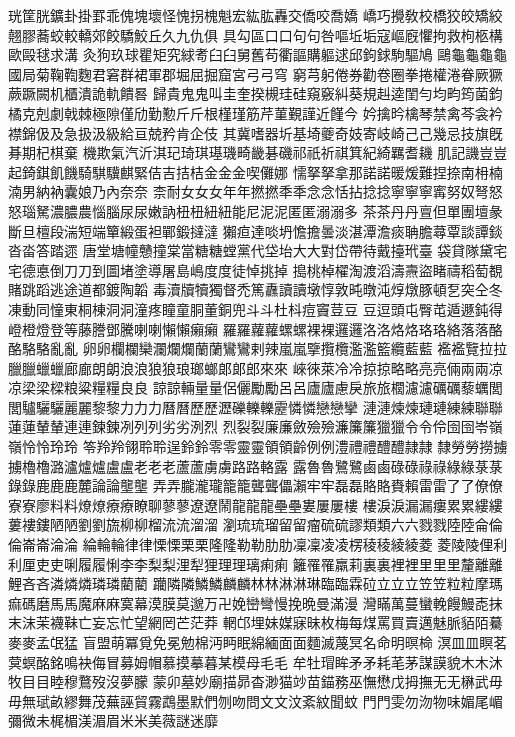 珖筐胱鑛卦掛罫乖傀塊壞怪愧拐槐魁宏紘肱轟交僑咬喬嬌
嶠巧攪敎校橋狡皎矯絞翹膠蕎蛟較轎郊餃驕鮫丘久九仇俱
具勾區⼝口句句咎嘔坵垢寇嶇廐懼拘救枸柩構歐毆毬求溝
灸狗玖球瞿矩究絿耉⾅臼舅舊苟衢謳購軀逑邱鉤銶駒驅鳩
鷗⿔龜龜龜國局菊鞠鞫麴君窘群裙軍郡堀屈掘窟宮⼸弓穹
窮芎躬倦券勸卷圈拳捲權淃眷厥獗蕨蹶闕机櫃潰詭軌饋晷
歸貴⿁鬼叫圭奎揆槻珪硅窺竅糾葵規赳逵閨勻均畇筠菌鈞
橘克剋劇戟棘極隙僅劤勤懃⽄斤根槿瑾筋芹菫覲謹近饉今
妗擒昑檎琴禁禽芩衾衿襟錦伋及急扱汲級給亘兢矜肯企伎
其冀嗜器圻基埼夔奇妓寄岐崎⼰己幾忌技旗旣朞期杞棋棄
機欺氣汽沂淇玘琦琪璂璣畸畿碁磯祁祇祈祺箕紀綺羈耆耭
肌記譏豈豈起錡錤飢饑騎騏驥麒緊佶吉拮桔⾦金金喫儺娜
懦拏拏拿那諾諾暖煖難捏捺南枏楠湳男納衲囊娘乃內奈奈
柰耐⼥女女年年撚撚秊秊念念恬拈捻捻寧寧寧寗努奴弩怒
怒瑙駑濃膿農惱腦尿尿嫩訥杻杻紐紐能尼泥泥匿匿溺溺多
茶茶丹丹亶但單團壇彖斷旦檀段湍短端簞緞蛋袒鄲鍛撻澾
獺疸達啖坍憺擔曇淡湛潭澹痰聃膽蕁覃談譚錟沓畓答踏遝
唐堂塘幢戇撞棠當糖糖螳黨代垈坮⼤大對岱帶待戴擡玳臺
袋貸隊黛宅宅德悳倒⼑刀到圖堵塗導屠島嶋度度徒悼挑掉
搗桃棹櫂淘渡滔濤燾盜睹禱稻萄覩賭跳蹈逃途道都鍍陶韜
毒瀆牘犢獨督禿篤纛讀讀墩惇敦旽暾沌焞燉豚頓乭突仝冬
凍動同憧東桐棟洞洞潼疼瞳童胴董銅兜⽃斗杜枓痘竇荳⾖
豆逗頭屯臀芚遁遯鈍得嶝橙燈登等藤謄鄧騰喇喇懶懶癩癩
羅羅蘿蘿螺螺裸裸邏邏洛洛烙烙珞珞絡落落酪酪駱駱亂亂
卵卵欄欄欒瀾爛爛蘭蘭鸞鸞剌辣嵐嵐擥攬欖濫濫籃纜藍藍
襤襤覽拉拉臘臘蠟蠟廊廊朗朗浪浪狼狼琅瑯螂郞郞郎來來
崍徠萊冷冷掠掠略略亮亮倆兩兩凉凉梁梁樑粮粱糧糧良良
諒諒輛量量侶儷勵勵呂呂廬廬慮戾旅旅櫚濾濾礪礪藜蠣閭
閭驢驪驪麗麗黎黎⼒力力曆曆歷歷瀝礫轢轢靂憐憐戀戀攣
漣漣煉煉璉璉練練聯聯蓮蓮輦輦連連鍊鍊冽列列劣劣洌烈
烈裂裂廉廉斂殮殮濂簾簾獵獵令令伶囹囹岺嶺嶺怜怜玲玲
笭羚羚翎聆聆逞鈴鈴零零靈靈領領齡例例澧禮禮醴醴隷隷
隸勞勞撈擄擄櫓櫓潞瀘爐爐盧盧⽼老老蘆蘆虜虜路路輅露
露魯魯鷺鷺⿄鹵碌碌祿祿綠綠菉菉錄錄⿅鹿鹿麓論論壟壟
弄弄朧瀧瓏籠籠聾聾儡瀨牢牢磊磊賂賂賚賴雷雷了了僚僚
寮寮廖料料燎燎療療瞭聊蓼蓼遼遼鬧⿓龍龍壘壘婁屢屢樓
樓淚淚漏漏瘻累累縷縷蔞褸鏤陋陋劉劉旒柳柳榴流流溜溜
瀏琉琉瑠留留瘤硫硫謬類類六六戮戮陸陸侖倫倫崙崙淪淪
綸輪輪律律慄慄栗栗隆隆勒勒肋肋凜凜凌凌楞稜稜綾綾菱
菱陵陵俚利利厘吏吏唎履履悧李李梨梨浬犁狸理理璃痢痢
籬罹罹羸莉裏裏裡裡⾥里里釐離離鯉吝吝潾燐燐璘璘藺藺
躪隣隣鱗鱗麟麟林林淋淋琳臨臨霖砬⽴立立笠笠粒粒摩瑪
痲碼磨⾺馬魔⿇麻寞幕漠膜莫邈万卍娩巒彎慢挽晩曼滿漫
灣瞞萬蔓蠻輓饅鰻唜抹末沫茉襪靺亡妄忘忙望網罔芒茫莽
輞邙埋妹媒寐昧枚梅每煤罵買賣邁魅脈貊陌驀⿆麥孟氓猛
盲盟萌冪覓免冕勉棉沔眄眠綿緬⾯面麵滅蔑冥名命明暝椧
溟⽫皿瞑茗蓂螟酩銘鳴袂侮冒募姆帽慕摸摹暮某模母⽑毛
牟牡瑁眸⽭矛耗芼茅謀謨貌⽊木沐牧⽬目睦穆鶩歿沒夢朦
蒙卯墓妙廟描昴杳渺猫竗苗錨務巫憮懋戊拇撫⽆无楙武⽏
毋無珷畝繆舞茂蕪誣貿霧鵡墨默們刎吻問⽂文汶紊紋聞蚊
⾨門雯勿沕物味媚尾嵋彌微未梶楣渼湄眉⽶米美薇謎迷靡
